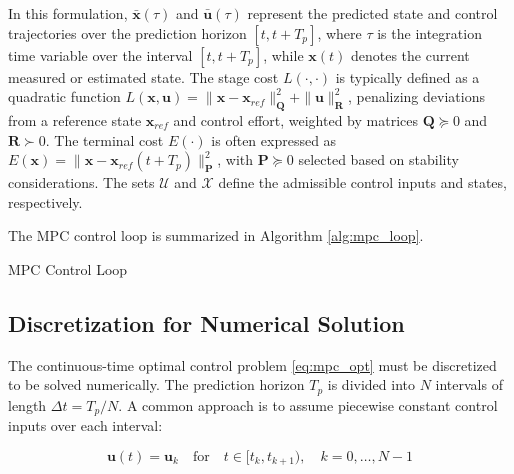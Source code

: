In this formulation, $\boldsymbol{\bar{x}}(\tau)$ and $\mathbf{\bar{u}}(\tau)$ represent the predicted state and control trajectories over the prediction horizon $[t, t+T_p]$, where $\tau$ is the integration time variable over the interval $[t, t+T_p]$, while $\boldsymbol{x}(t)$ denotes the current measured or estimated state. The stage cost $L(\cdot, \cdot)$ is typically defined as a quadratic function $L(\boldsymbol{x}, \mathbf{u}) = \|\boldsymbol{x} - \boldsymbol{x}_{ref}\|_{\boldsymbol{Q}}^2 + \|\mathbf{u}\|_{\boldsymbol{R}}^2$, penalizing deviations from a reference state $\boldsymbol{x}_{ref}$ and control effort, weighted by matrices $\boldsymbol{Q} \succeq 0$ and $\boldsymbol{R} \succ 0$. The terminal cost $E(\cdot)$ is often expressed as $E(\boldsymbol{x}) = \|\boldsymbol{x} - \boldsymbol{x}_{ref}(t+T_p)\|_{\boldsymbol{P}}^2$, with $\boldsymbol{P} \succeq 0$ selected based on stability considerations. The sets $\mathcal{U}$ and $\mathcal{X}$ define the admissible control inputs and states, respectively.

The MPC control loop is summarized in Algorithm \ref{alg:mpc_loop}.

\begin{algorithm}[H]
\caption{MPC Control Loop}
\label{alg:mpc_loop}
\SetAlgoLined
{}

\While{MPC is running}{
    Measure or estimate the current state $\boldsymbol{x}(t)$\;
    Solve the optimal control problem~\eqref{eq:mpc_opt} to get optimal control sequence $\mathbf{\bar{u}}^*(\tau)$ for $\tau \in [t, t+T_p]$\;
    Apply the first control input $\mathbf{u}^*(t) = \mathbf{\bar{u}}^*(t)$ over $[t, t+\delta)$\;
}
\end{algorithm}

\subsection{Discretization for Numerical Solution}

The continuous-time optimal control problem \eqref{eq:mpc_opt} must be discretized to be solved numerically. The prediction horizon $T_p$ is divided into $N$ intervals of length $\Delta t = T_p/N$. A common approach is to assume piecewise constant control inputs over each interval:

\begin{equation}
    \mathbf{u}(t) = \mathbf{u}_k \quad \text{for} \quad t \in [t_k, t_{k+1}), \quad k = 0, \dots, N-1
\end{equation}

